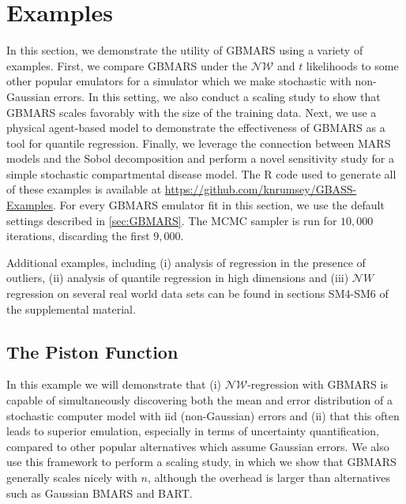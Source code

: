 \documentclass{article} %
\newcommand{\NIG}{\mathcal{NW}}
\newcommand{\NW}{\mathcal{NW}}
\begin{document}
\section{Examples}
\label{sec:examples}

In this section, we demonstrate the utility of GBMARS using a variety of examples. First, we compare GBMARS under the $\NW$ and $t$ likelihoods to some other popular emulators for a simulator which we make stochastic with non-Gaussian errors. In this setting, we also conduct a scaling study to show that GBMARS scales favorably with the size of the training data. Next, we use a physical agent-based model to demonstrate the effectiveness of GBMARS as a tool for quantile regression. Finally, we leverage the connection between MARS models and the Sobol decomposition and perform a novel sensitivity study for a simple stochastic compartmental disease model. The R code used to generate all of these examples is available at \url{https://github.com/knrumsey/GBASS-Examples}. For every GBMARS emulator fit in this section, we use the default settings described in \cref{sec:GBMARS}. The MCMC sampler is run for $10,000$ iterations, discarding the first $9,000$. 

Additional examples, including (i) analysis of regression in the presence of outliers, (ii) analysis of quantile regression in high dimensions and (iii) $\mathcal NW$ regression on several real world data sets can be found in sections SM4-SM6 of the supplemental material.  

\subsection{The Piston Function}
In this example we will demonstrate that (i) $\NIG$-regression with GBMARS is capable of simultaneously discovering both the mean and error distribution of a stochastic computer model with iid (non-Gaussian) errors and (ii) that this often leads to superior emulation, especially in terms of uncertainty quantification, compared to other popular alternatives which assume Gaussian errors. We also use this framework to perform a scaling study, in which we show that GBMARS generally scales nicely with $n$, although the overhead is larger than alternatives such as Gaussian BMARS and BART.  
\end{document}
